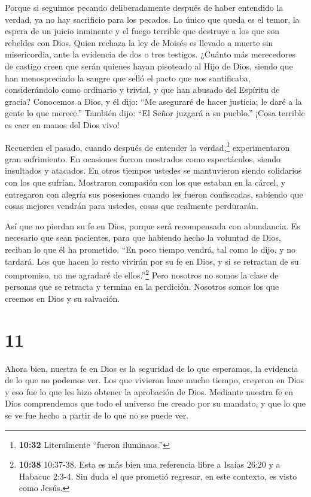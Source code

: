  Porque si seguimos pecando deliberadamente después de
haber entendido la verdad, ya no hay sacrificio para los pecados.
 Lo único que queda es el temor, la espera de un juicio
inminente y el fuego terrible que destruye a los que son rebeldes con
Dios.  Quien rechaza la ley de Moisés es llevado a muerte
sin misericordia, ante la evidencia de dos o tres testigos.
 ¿Cuánto más merecedores de castigo creen que serán quienes
hayan pisoteado al Hijo de Dios, siendo que han menospreciado la sangre
que selló el pacto que nos santificaba, considerándolo como ordinario y
trivial, y que han abusado del Espíritu de gracia? 
Conocemos a Dios, y él dijo: ``Me aseguraré de hacer justicia; le daré a
la gente lo que merece.'' También dijo: ``El Señor juzgará a su
pueblo.''  ¡Cosa terrible es caer en manos del Dios vivo!

 Recuerden el pasado, cuando después de entender la
verdad,\footnote{\textbf{10:32} Literalmente ``fueron iluminaos.''}
experimentaron gran sufrimiento.  En ocasiones fueron
mostrados como espectáculos, siendo insultados y atacados. En otros
tiempos ustedes se mantuvieron siendo solidarios con los que sufrían.
 Mostraron compasión con los que estaban en la cárcel, y
entregaron con alegría sus posesiones cuando les fueron confiscadas,
sabiendo que cosas mejores vendrán para ustedes, cosas que realmente
perdurarán.

 Así que no pierdan su fe en Dios, porque será recompensada
con abundancia.  Es necesario que sean pacientes, para que
habiendo hecho la voluntad de Dios, reciban lo que él ha prometido.
 ``En poco tiempo vendrá, tal como lo dijo, y no tardará.
 Los que hacen lo recto vivirán por su fe en Dios, y si se
retractan de su compromiso, no me agradaré de ellos.''\footnote{\textbf{10:38}
  10:37-38. Esta es más bien una referencia libre a Isaías 26:20 y a
  Habacuc 2:3-4. Sin duda el que prometió regresar, en este contexto, es
  visto como Jesús.}  Pero nosotros no somos la clase de
personas que se retracta y termina en la perdición. Nosotros somos los
que creemos en Dios y su salvación.

\hypertarget{section-10}{%
\section{11}\label{section-10}}

 Ahora bien, nuestra fe en Dios es la seguridad de lo que
esperamos, la evidencia de lo que no podemos ver.  Los que
vivieron hace mucho tiempo, creyeron en Dios y eso fue lo que les hizo
obtener la aprobación de Dios.  Mediante nuestra fe en Dios
comprendemos que todo el universo fue creado por su mandato, y que lo
que se ve fue hecho a partir de lo que no se puede ver.

